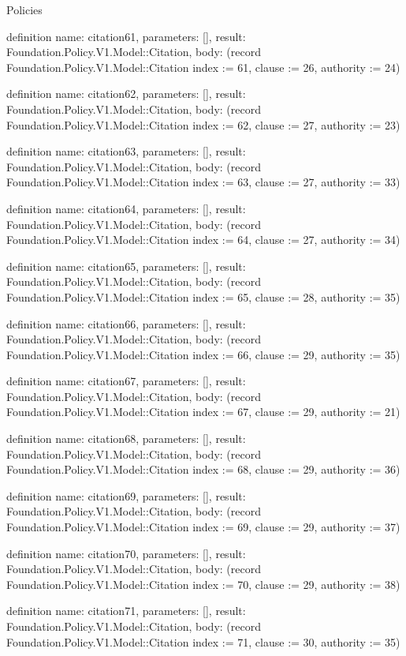 \begin{lexlean}{Policies}
\begin{semanticmodule}
definition{
  name: citation61,
  parameters: [],
  result: Foundation.Policy.V1.Model::Citation,
  body: (record Foundation.Policy.V1.Model::Citation {index := 61, clause := 26, authority := 24})
}

definition{
  name: citation62,
  parameters: [],
  result: Foundation.Policy.V1.Model::Citation,
  body: (record Foundation.Policy.V1.Model::Citation {index := 62, clause := 27, authority := 23})
}

definition{
  name: citation63,
  parameters: [],
  result: Foundation.Policy.V1.Model::Citation,
  body: (record Foundation.Policy.V1.Model::Citation {index := 63, clause := 27, authority := 33})
}

definition{
  name: citation64,
  parameters: [],
  result: Foundation.Policy.V1.Model::Citation,
  body: (record Foundation.Policy.V1.Model::Citation {index := 64, clause := 27, authority := 34})
}

definition{
  name: citation65,
  parameters: [],
  result: Foundation.Policy.V1.Model::Citation,
  body: (record Foundation.Policy.V1.Model::Citation {index := 65, clause := 28, authority := 35})
}

definition{
  name: citation66,
  parameters: [],
  result: Foundation.Policy.V1.Model::Citation,
  body: (record Foundation.Policy.V1.Model::Citation {index := 66, clause := 29, authority := 35})
}

definition{
  name: citation67,
  parameters: [],
  result: Foundation.Policy.V1.Model::Citation,
  body: (record Foundation.Policy.V1.Model::Citation {index := 67, clause := 29, authority := 21})
}

definition{
  name: citation68,
  parameters: [],
  result: Foundation.Policy.V1.Model::Citation,
  body: (record Foundation.Policy.V1.Model::Citation {index := 68, clause := 29, authority := 36})
}

definition{
  name: citation69,
  parameters: [],
  result: Foundation.Policy.V1.Model::Citation,
  body: (record Foundation.Policy.V1.Model::Citation {index := 69, clause := 29, authority := 37})
}

definition{
  name: citation70,
  parameters: [],
  result: Foundation.Policy.V1.Model::Citation,
  body: (record Foundation.Policy.V1.Model::Citation {index := 70, clause := 29, authority := 38})
}

definition{
  name: citation71,
  parameters: [],
  result: Foundation.Policy.V1.Model::Citation,
  body: (record Foundation.Policy.V1.Model::Citation {index := 71, clause := 30, authority := 35})
}


\end{semanticmodule}
\end{lexlean}
